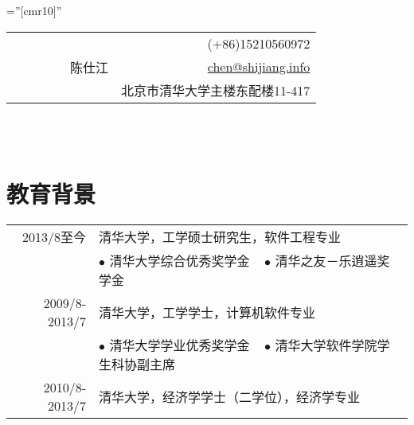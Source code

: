 \documentclass[a4paper,10pt]{professional-cv-cn}
\begin{document}

\pagestyle{empty} %

\font\fb=''[cmr10]'' %

\begin{tabular}{lr}
\multirow{3}{24em}{\Huge ~~~~~~~~~陈仕江}
    & (+86)15210560972 \\
    & \href{mailto:chen@shijiang.info}{chen@shijiang.info} \\
    & 北京市清华大学主楼东配楼11-417 \\
\end{tabular}
\\
\\



\section{教育背景}
\begin{tabular}{rl} 
 \textsc{2013/8至今} & 清华大学，工学硕士研究生，软件工程专业 \\
 & \small{$\bullet$ 清华大学综合优秀奖学金 ~ $\bullet$ 清华之友－乐逍遥奖学金} \\
 \textsc{2009/8-2013/7} & 清华大学，工学学士，计算机软件专业 \\
 & \small{$\bullet$ 清华大学学业优秀奖学金 ~ $\bullet$ 清华大学软件学院学生科协副主席} \\
 \textsc{2010/8-2013/7} & 清华大学，经济学学士（二学位），经济学专业
\end{tabular}
\end{document}
